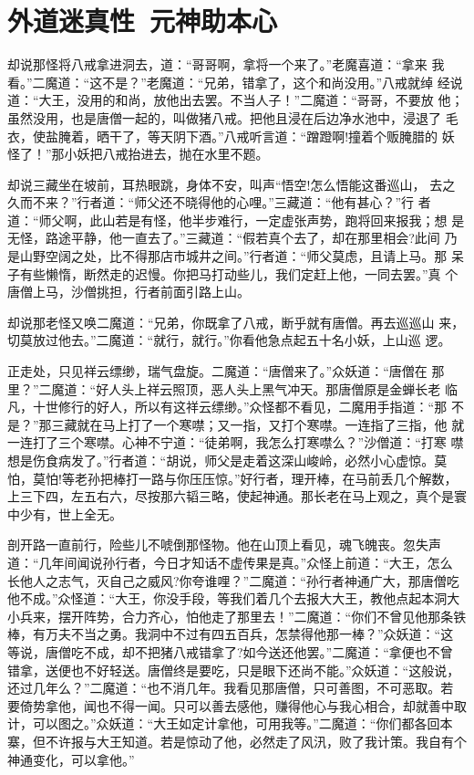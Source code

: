 \chapter{外道迷真性~元神助本心}

却说那怪将八戒拿进洞去，道：“哥哥啊，拿将一个来了。”老魔喜道：“拿来
我看。”二魔道：“这不是？”老魔道：“兄弟，错拿了，这个和尚没用。”八戒就绰
经说道：“大王，没用的和尚，放他出去罢。不当人子！”二魔道：“哥哥，不要放
他；虽然没用，也是唐僧一起的，叫做猪八戒。把他且浸在后边净水池中，浸退了
毛衣，使盐腌着，晒干了，等天阴下酒。”八戒听言道：“蹭蹬啊!撞着个贩腌腊的
妖怪了！”那小妖把八戒抬进去，抛在水里不题。

却说三藏坐在坡前，耳热眼跳，身体不安，叫声“悟空!怎么悟能这番巡山，
去之久而不来？”行者道：“师父还不晓得他的心哩。”三藏道：“他有甚心？”行
者道：“师父啊，此山若是有怪，他半步难行，一定虚张声势，跑将回来报我；想
是无怪，路途平静，他一直去了。”三藏道：“假若真个去了，却在那里相会?此间
乃是山野空阔之处，比不得那店市城井之间。”行者道：“师父莫虑，且请上马。那
呆子有些懒惰，断然走的迟慢。你把马打动些儿，我们定赶上他，一同去罢。”真
个唐僧上马，沙僧挑担，行者前面引路上山。

却说那老怪又唤二魔道：“兄弟，你既拿了八戒，断乎就有唐僧。再去巡巡山
来，切莫放过他去。”二魔道：“就行，就行。”你看他急点起五十名小妖，上山巡
逻。

正走处，只见祥云缥缈，瑞气盘旋。二魔道：“唐僧来了。”众妖道：“唐僧在
那里？”二魔道：“好人头上祥云照顶，恶人头上黑气冲天。那唐僧原是金蝉长老
临凡，十世修行的好人，所以有这祥云缥缈。”众怪都不看见，二魔用手指道：“那
不是？”那三藏就在马上打了一个寒噤；又一指，又打个寒噤。一连指了三指，他
就一连打了三个寒噤。心神不宁道：“徒弟啊，我怎么打寒噤么？”沙僧道：“打寒
噤想是伤食病发了。”行者道：“胡说，师父是走着这深山峻岭，必然小心虚惊。莫
怕，莫怕!等老孙把棒打一路与你压压惊。”好行者，理开棒，在马前丢几个解数，
上三下四，左五右六，尽按那六韬三略，使起神通。那长老在马上观之，真个是寰
中少有，世上全无。

剖开路一直前行，险些儿不唬倒那怪物。他在山顶上看见，魂飞魄丧。忽失声
道：“几年间闻说孙行者，今日才知话不虚传果是真。”众怪上前道：“大王，怎么
长他人之志气，灭自己之威风?你夸谁哩？”二魔道：“孙行者神通广大，那唐僧吃
他不成。”众怪道：“大王，你没手段，等我们着几个去报大大王，教他点起本洞大
小兵来，摆开阵势，合力齐心，怕他走了那里去！”二魔道：“你们不曾见他那条铁
棒，有万夫不当之勇。我洞中不过有四五百兵，怎禁得他那一棒？”众妖道：“这
等说，唐僧吃不成，却不把猪八戒错拿了?如今送还他罢。”二魔道：“拿便也不曾
错拿，送便也不好轻送。唐僧终是要吃，只是眼下还尚不能。”众妖道：“这般说，
还过几年么？”二魔道：“也不消几年。我看见那唐僧，只可善图，不可恶取。若
要倚势拿他，闻也不得一闻。只可以善去感他，赚得他心与我心相合，却就善中取
计，可以图之。”众妖道：“大王如定计拿他，可用我等。”二魔道：“你们都各回本
寨，但不许报与大王知道。若是惊动了他，必然走了风汛，败了我计策。我自有个
神通变化，可以拿他。”

